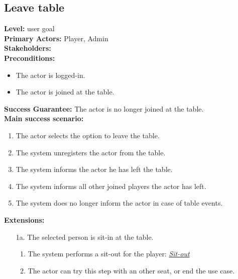 \documentclass[a4paper,11pt]{report}
\begin{document}
\subsection{Leave table}
\textbf{Level:} user goal \\
\textbf{Primary Actors:} Player, Admin \\
\textbf{Stakeholders:} \\
\textbf{Preconditions:}
\begin{itemize}
\item The actor is logged-in.
\item The actor is joined at the table.
\end{itemize}
\textbf{Success Guarantee:} The actor is no longer joined at the table. \\
\textbf{Main success scenario:} 
\begin{enumerate}
\item The actor selects the option to leave the table.
\item The system unregisters the actor from the table.
\item The system informs the actor he has left the table. 
\item The system informs all other joined players the actor has left. 
\item The system does no longer inform the actor in case of table events.
\end{enumerate}
\textbf{Extensions:}
\begin{itemize}
\item[1a.] The selected person is sit-in at the table. 
\begin{enumerate}
\item The system performs a sit-out for the player: \emph{\underline{Sit-out}}
\item The actor can try this step with an other seat, or end the use case.
\end{enumerate}
\end{itemize}
\end{document}
